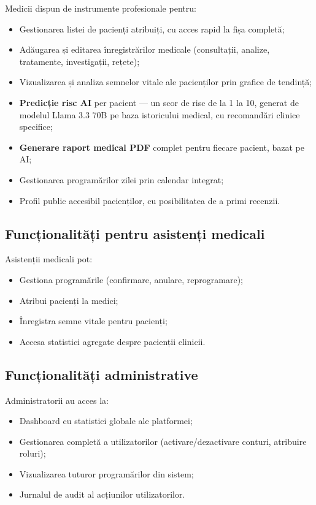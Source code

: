 Medicii dispun de instrumente profesionale pentru:
\begin{itemize}
  \item Gestionarea listei de pacienți atribuiți, cu acces rapid la fișa completă;
  \item Adăugarea și editarea înregistrărilor medicale (consultații, analize, tratamente, investigații, rețete);
  \item Vizualizarea și analiza semnelor vitale ale pacienților prin grafice de tendință;
  \item \textbf{Predicție risc AI} per pacient — un scor de risc de la 1 la 10, generat de modelul Llama 3.3 70B pe baza istoricului medical, cu recomandări clinice specifice;
  \item \textbf{Generare raport medical PDF} complet pentru fiecare pacient, bazat pe AI;
  \item Gestionarea programărilor zilei prin calendar integrat;
  \item Profil public accesibil pacienților, cu posibilitatea de a primi recenzii.
\end{itemize}

\subsection{Funcționalități pentru asistenți medicali}

Asistenții medicali pot:
\begin{itemize}
  \item Gestiona programările (confirmare, anulare, reprogramare);
  \item Atribui pacienți la medici;
  \item Înregistra semne vitale pentru pacienți;
  \item Accesa statistici agregate despre pacienții clinicii.
\end{itemize}

\subsection{Funcționalități administrative}

Administratorii au acces la:
\begin{itemize}
  \item Dashboard cu statistici globale ale platformei;
  \item Gestionarea completă a utilizatorilor (activare/dezactivare conturi, atribuire roluri);
  \item Vizualizarea tuturor programărilor din sistem;
  \item Jurnalul de audit al acțiunilor utilizatorilor.
\end{itemize}

